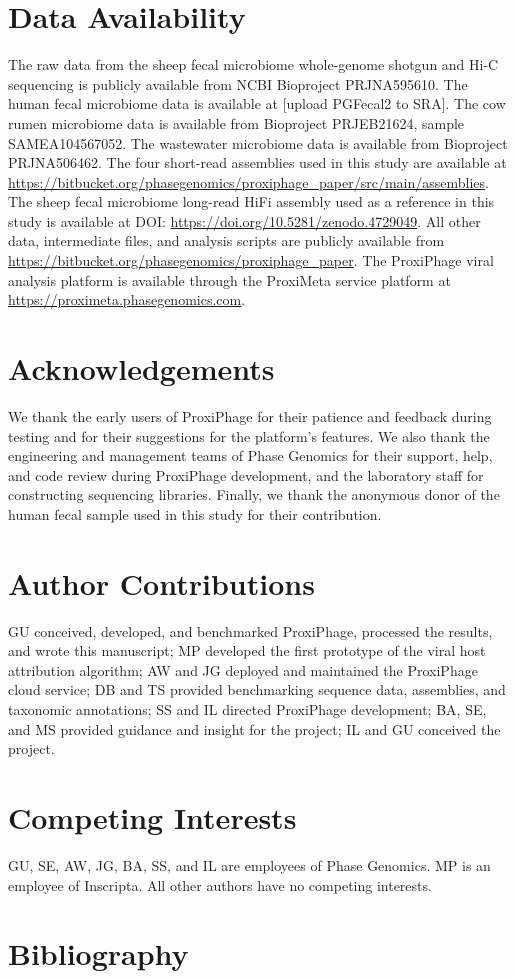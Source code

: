     
\section*{Data Availability}
	The raw data from the sheep fecal microbiome whole-genome shotgun and Hi-C sequencing is publicly available from NCBI Bioproject PRJNA595610. The human fecal microbiome data is available at [upload PGFecal2 to SRA]. The cow rumen microbiome data is available from Bioproject PRJEB21624, sample SAMEA104567052. The wastewater microbiome data is available from Bioproject PRJNA506462. The four short-read assemblies used in this study are available at \url{https://bitbucket.org/phasegenomics/proxiphage_paper/src/main/assemblies}. The sheep fecal microbiome long-read HiFi assembly used as a reference in this study is available at DOI: \url{https://doi.org/10.5281/zenodo.4729049}. All other data, intermediate files, and analysis scripts are publicly available from \url{https://bitbucket.org/phasegenomics/proxiphage_paper}.  The ProxiPhage viral analysis platform is available through the ProxiMeta service platform at \url{https://proximeta.phasegenomics.com}. 

\section*{Acknowledgements}
    We thank the early users of ProxiPhage for their patience and feedback during testing and for their suggestions for the platform’s features. We also thank the engineering and management teams of Phase Genomics for their support, help, and code review during ProxiPhage development, and the laboratory staff for constructing sequencing libraries. Finally, we thank the anonymous donor of the human fecal sample used in this study for their contribution.

\section*{Author Contributions}
    GU conceived, developed, and benchmarked ProxiPhage, processed the results, and wrote this manuscript; MP developed the first prototype of the viral host attribution algorithm; AW and JG deployed and maintained the ProxiPhage cloud service; DB and TS provided benchmarking sequence data, assemblies, and taxonomic annotations; SS and IL directed ProxiPhage development; BA, SE, and MS provided guidance and insight for the project; IL and GU conceived the project.

\section*{Competing Interests}
    GU, SE, AW, JG, BA, SS, and IL are employees of Phase Genomics. MP is an employee of Inscripta. All other authors have no competing interests.

\section*{Bibliography}


